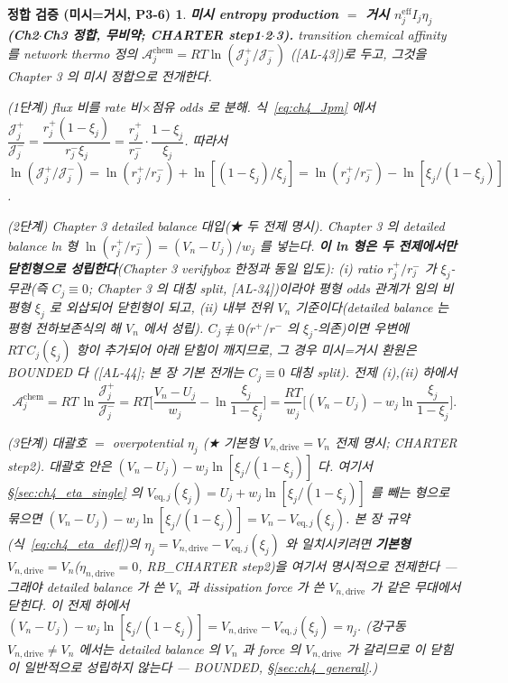 \documentclass[11pt,a4paper]{article}
\newtheorem*{verifybox}{정합 검증 (미시=거시, P3-6)}
\newcommand{\eff}{\mathrm{eff}}
\newcommand{\eq}{\mathrm{eq}}
\newcommand{\drive}{\mathrm{drive}}
\newcommand{\chem}{\mathrm{chem}}
\newcommand{\AL}[1]{\textsf{[AL-#1]}}
\begin{document}
\begin{verifybox}
\textbf{미시 entropy production $=$ 거시 $n_j^{\eff}I_j\eta_j$ (Ch2$\cdot$Ch3 정합, 무비약; CHARTER step1$\cdot$2$\cdot$3).}
transition chemical affinity 를 network thermo 정의 $\mathcal A_j^{\chem}=RT\ln(\mathcal J_j^+/\mathcal J_j^-)$
(\AL{43})로 두고, 그것을 Chapter 3 의 미시 정합으로 전개한다.

\emph{(1단계) flux 비를 rate 비$\times$점유 odds 로 분해.} 식~\eqref{eq:ch4_Jpm} 에서
$\dfrac{\mathcal J_j^+}{\mathcal J_j^-}=\dfrac{r_j^+(1-\xi_j)}{r_j^-\xi_j}=\dfrac{r_j^+}{r_j^-}\cdot\dfrac{1-\xi_j}{\xi_j}$.
따라서 $\ln(\mathcal J_j^+/\mathcal J_j^-)=\ln(r_j^+/r_j^-)+\ln[(1-\xi_j)/\xi_j]=\ln(r_j^+/r_j^-)-\ln[\xi_j/(1-\xi_j)]$.

\emph{(2단계) Chapter 3 detailed balance 대입(★ 두 전제 명시).} Chapter 3 의 detailed balance ln 형
$\ln(r_j^+/r_j^-)=(V_n-U_j)/w_j$ 를 넣는다. \textbf{이 ln 형은 두 전제에서만 닫힌형으로 성립한다}(Chapter 3
verifybox 한정과 \emph{동일 입도}): (i) ratio $r_j^+/r_j^-$ 가 $\xi_j$\emph{-무관}(즉 $C_j\equiv0$; Chapter 3 의
대칭 split, \AL{34})이라야 \emph{평형} odds 관계가 임의 \emph{비평형} $\xi_j$ 로 외삽되어 닫힌형이 되고, (ii)
\emph{내부 전위} $V_n$ 기준이다(detailed balance 는 평형 전하보존식의 해 $V_n$ 에서 성립). $C_j\not\equiv0$($r^+/r^-$
의 $\xi_j$-의존)이면 우변에 $RT\,C_j(\xi_j)$ 항이 추가되어 아래 닫힘이 깨지므로, 그 경우 미시=거시 환원은 BOUNDED 다
(\AL{44}; 본 장 기본 전개는 $C_j\equiv0$ 대칭 split). 전제 (i),(ii) 하에서
\begin{equation}
\mathcal A_j^{\chem}=RT\,\ln\!\frac{\mathcal J_j^+}{\mathcal J_j^-}
=RT\Big[\frac{V_n-U_j}{w_j}-\ln\frac{\xi_j}{1-\xi_j}\Big]
=\frac{RT}{w_j}\Big[(V_n-U_j)-w_j\ln\frac{\xi_j}{1-\xi_j}\Big].
\label{eq:ch4_affinity_raw}
\end{equation}

\emph{(3단계) 대괄호 $=$ overpotential $\eta_j$ (★ 기본형 $V_{n,\drive}=V_n$ 전제 명시; CHARTER step2).}
대괄호 안은 $(V_n-U_j)-w_j\ln[\xi_j/(1-\xi_j)]$ 다. 여기서 \S\ref{sec:ch4_eta_single} 의 $V_{\eq,j}(\xi_j)=U_j
+w_j\ln[\xi_j/(1-\xi_j)]$ 를 빼는 형으로 묶으면 $(V_n-U_j)-w_j\ln[\xi_j/(1-\xi_j)]=V_n-V_{\eq,j}(\xi_j)$. 본 장
규약(식~\eqref{eq:ch4_eta_def})의 $\eta_j=V_{n,\drive}-V_{\eq,j}(\xi_j)$ 와 일치시키려면 \textbf{기본형
$V_{n,\drive}=V_n$}($\eta_{n,\drive}=0$, RB\_CHARTER step2)을 \emph{여기서 명시적으로 전제}한다 — 그래야
detailed balance 가 쓴 $V_n$ 과 dissipation force 가 쓴 $V_{n,\drive}$ 가 같은 무대에서 닫힌다. 이 전제 하에서
$(V_n-U_j)-w_j\ln[\xi_j/(1-\xi_j)]=V_{n,\drive}-V_{\eq,j}(\xi_j)=\eta_j$. (강구동 $V_{n,\drive}\ne V_n$ 에서는
detailed balance 의 $V_n$ 과 force 의 $V_{n,\drive}$ 가 갈리므로 이 닫힘이 일반적으로 성립하지 않는다 —
BOUNDED, \S\ref{sec:ch4_general}.)


\end{verifybox}
\end{document}
